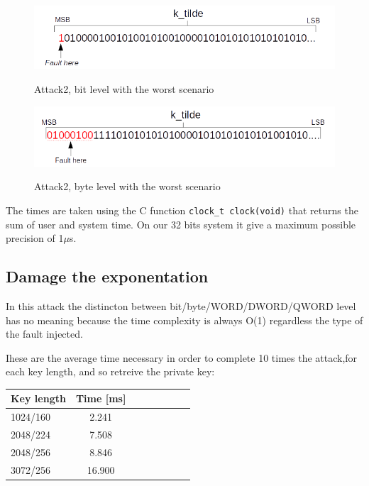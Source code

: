 \documentclass[11pt,english]{article}
\begin{document}
\begin{figure}[H]
\includegraphics[width=1.0\textwidth]{img/worstcasebitfault.png} \\
\caption{\label{f_etichetta}Attack2, bit level with the worst scenario }
\end{figure}

\begin{figure}[H]
\includegraphics[width=1.0\textwidth]{img/attack2byteworst.png} \\
\caption{\label{f_etichetta}Attack2, byte level with the worst scenario }
\end{figure}

The times are taken using the C function \texttt{clock\_t clock(void)} that returns the sum of user and system time. On our 32 bits system it give a maximum possible precision of 1$\mu$s.

\subsection{Damage the exponentation}

In this attack the distincton between bit/byte/WORD/DWORD/QWORD level has no meaning because the time complexity is always O(1) regardless the type of the fault injected. 

Ihese are the average time necessary in order to complete 10 times the attack,for each key length, and so retreive the private key:

\begin{center}
\begin{tabular}{l*{6}{c}r}
Key length        & Time [ms] \\
\hline
1024/160 &       2.241  \\
2048/224 &       7.508  \\
2048/256 &       8.846  \\
3072/256 &      16.900 \\ 
\end{tabular}
\end{center}
\end{document}
